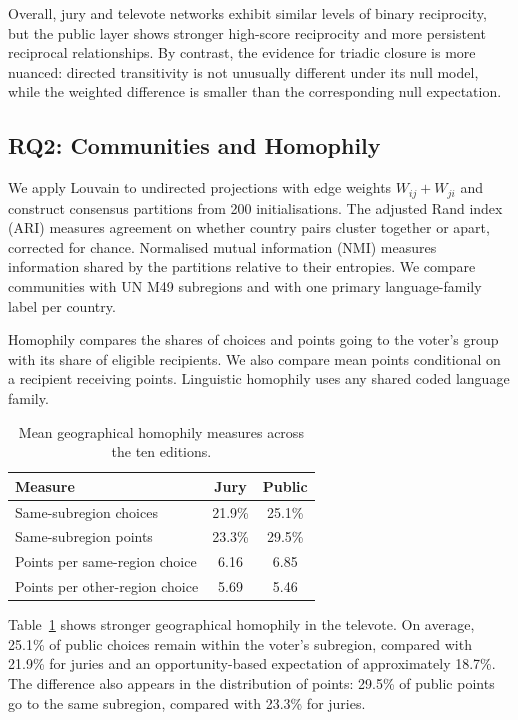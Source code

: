 \documentclass[12pt,a4paper]{article}
\begin{document}
Overall, jury and televote networks exhibit
similar levels of binary reciprocity, but
the public layer shows stronger high-score
reciprocity and more persistent reciprocal
relationships. By contrast, the evidence for triadic closure is more
nuanced: directed transitivity is not unusually different
under its null model, while the weighted difference is
smaller than the corresponding null expectation. 



\FloatBarrier

\subsection{RQ2: Communities and Homophily}

We apply Louvain \cite{blondel2008} to undirected projections with
edge weights $W_{ij}+W_{ji}$ and construct consensus partitions from
200 initialisations. The adjusted Rand index (ARI) \cite{hubert1985}
measures agreement on whether country pairs cluster together or
apart, corrected for chance. Normalised mutual information (NMI)
\cite{danon2005} measures information shared by the partitions
relative to their entropies. We compare communities with UN M49
subregions and with one primary language-family label per country.

Homophily compares the shares of choices and points going to the
voter's group with its share of eligible recipients. We also compare
mean points conditional on a recipient receiving points. Linguistic
homophily uses any shared coded language family.

\begin{table}[htbp]
\centering
\caption{Mean geographical homophily measures
across the ten editions.}
\label{tab:rq2_homophily}
\small
\begin{tabular}{lcc}
\toprule
\textbf{Measure} & \textbf{Jury} & \textbf{Public} \\
\midrule
Same-subregion choices & 21.9\% & 25.1\% \\
Same-subregion points & 23.3\% & 29.5\% \\
Points per same-region choice & 6.16 & 6.85 \\
Points per other-region choice & 5.69 & 5.46 \\
\bottomrule
\end{tabular}
\end{table}

Table~\ref{tab:rq2_homophily} shows stronger geographical homophily
in the televote. On average, 25.1\% of public choices
remain within the voter's subregion, compared with
21.9\% for juries and an opportunity-based expectation
of approximately 18.7\%. The difference also
appears in the distribution of points: 29.5\%
of public points go to the same subregion,
compared with 23.3\% for juries.
\end{document}
